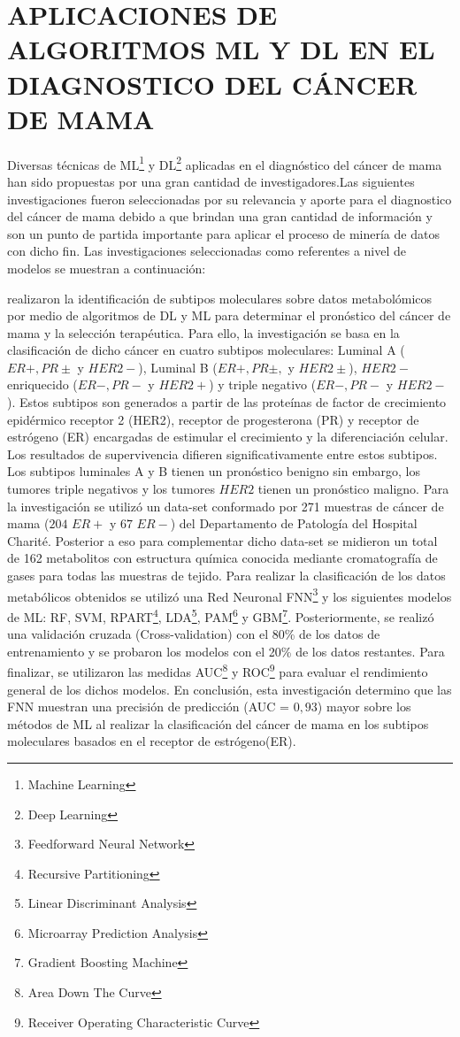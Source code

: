 \section{APLICACIONES DE ALGORITMOS ML Y DL EN EL DIAGNOSTICO DEL CÁNCER DE MAMA}
Diversas técnicas de ML\footnote{Machine Learning} y DL\footnote{Deep Learning} aplicadas en el diagnóstico del cáncer de mama han sido propuestas por una gran cantidad de investigadores.Las siguientes investigaciones fueron seleccionadas por su relevancia y aporte para el diagnostico del cáncer de mama debido a que brindan una gran cantidad de información y son un punto de partida importante para aplicar el proceso de minería de datos con dicho fin. Las investigaciones seleccionadas como referentes a nivel de modelos se muestran a continuación:

\cite{Alakwaa2018} realizaron la identificación de subtipos moleculares sobre datos metabolómicos por medio de algoritmos de DL y ML para determinar el pronóstico del cáncer de mama y la selección terapéutica. Para ello, la investigación se basa en la clasificación de dicho cáncer en cuatro subtipos moleculares: Luminal A ($ER +, PR \pm$ y $HER2-$), Luminal B ($ER +, PR \pm,$ y $HER2\pm$), $HER2-$ enriquecido ($ER-, PR-$ y $HER2 +$) y triple negativo ($ER-, PR-$ y $HER2 -$). Estos subtipos son generados a partir de las proteínas de factor de crecimiento epidérmico receptor 2 (HER2), receptor de progesterona (PR) y receptor de estrógeno (ER) encargadas de estimular el crecimiento y la diferenciación celular. Los resultados de supervivencia difieren significativamente entre estos subtipos. Los subtipos luminales A y B tienen un pronóstico benigno sin embargo, los tumores triple negativos y los tumores $HER2$ tienen un pronóstico maligno. Para la investigación se utilizó un data-set conformado por 271 muestras de cáncer de mama ($204$ $ER+ $ y $67$ $ER- $) del Departamento de Patología del Hospital Charité. Posterior a eso para complementar dicho data-set se midieron un total de 162 metabolitos con estructura química conocida mediante cromatografía de gases para todas las muestras de tejido. Para realizar la clasificación de los datos metabólicos obtenidos se utilizó una Red Neuronal FNN\footnote{Feedforward Neural Network} y los siguientes modelos de ML: RF, SVM, RPART\footnote{Recursive Partitioning}, LDA\footnote{Linear Discriminant Analysis}, PAM\footnote{Microarray Prediction Analysis} y GBM\footnote{Gradient Boosting Machine}. Posteriormente, se realizó una validación cruzada (Cross-validation) con el 80\% de los datos de entrenamiento y se probaron los modelos con el 20\% de los datos restantes. Para finalizar, se utilizaron las medidas AUC\footnote{Area Down The Curve} y ROC\footnote{Receiver Operating Characteristic Curve} para evaluar el rendimiento general de los dichos modelos. En conclusión, esta investigación determino que las FNN muestran una precisión de predicción (AUC = $0,93$) mayor sobre los métodos de ML al realizar la clasificación del cáncer de mama en los subtipos moleculares basados en el receptor de estrógeno(ER).

